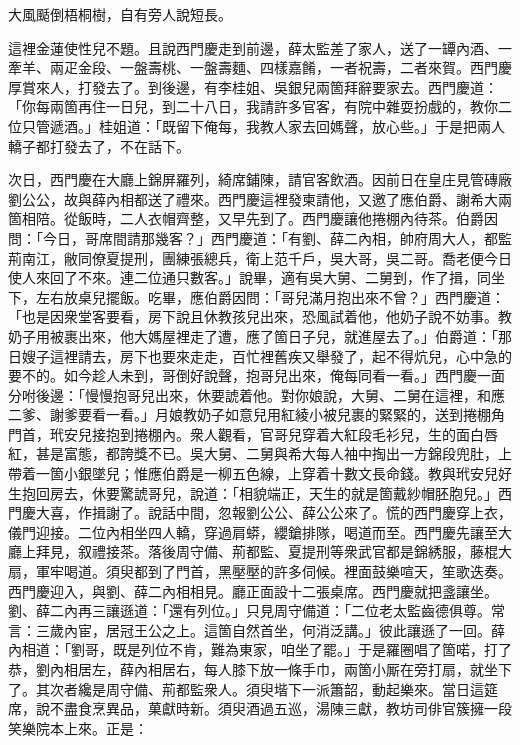 \begin{myquote}
大風颳倒梧桐樹，自有旁人說短長。
\end{myquote}

這裡金蓮使性兒不題。且說西門慶走到前邊，薛太監差了家人，送了一罈內酒、一牽羊、兩疋金段、一盤壽桃、一盤壽麵、四樣嘉餚，一者祝壽，二者來賀。西門慶厚賞來人，打發去了。到後邊，有李桂姐、吳銀兒兩箇拜辭要家去。西門慶道：「你每兩箇再住一日兒，到二十八日，我請許多官客，有院中雜耍扮戲的，教你二位只管遞酒。」桂姐道：「既留下俺每，我教人家去回媽聲，放心些。」于是把兩人轎子都打發去了，不在話下。

次日，西門慶在大廳上錦屏羅列，綺席鋪陳，請官客飲酒。因前日在皇庄見管磚廠劉公公，故與薛內相都送了禮來。西門慶這裡發柬請他，又邀了應伯爵、謝希大兩箇相陪。從飯時，二人衣帽齊整，又早先到了。西門慶讓他捲棚內待茶。伯爵因問：「今日，哥席間請那幾客？」西門慶道：「有劉、薛二內相，帥府周大人，都監荊南江，敝同僚夏提刑，團練張總兵，衛上范千戶，吳大哥，吳二哥。喬老便今日使人來回了不來。連二位通只數客。」說畢，適有吳大舅、二舅到，作了揖，同坐下，左右放桌兒擺飯。吃畢，應伯爵因問：「哥兒滿月抱出來不曾？」西門慶道：「也是因衆堂客要看，房下說且休教孩兒出來，恐風試着他，他奶子說不妨事。教奶子用被裹出來，他大媽屋裡走了遭，應了箇日子兒，就進屋去了。」伯爵道：「那日嫂子這裡請去，房下也要來走走，百忙裡舊疾又舉發了，起不得炕兒，心中急的要不的。如今趁人未到，哥倒好說聲，抱哥兒出來，俺每同看一看。」西門慶一面分咐後邊：「慢慢抱哥兒出來，休要諕着他。對你娘說，大舅、二舅在這裡，和應二爹、謝爹要看一看。」月娘教奶子如意兒用紅綾小被兒裹的緊緊的，送到捲棚角門首，玳安兒接抱到捲棚內。衆人觀看，官哥兒穿着大紅段毛衫兒，生的面白唇紅，甚是富態，都誇獎不已。吳大舅、二舅與希大每人袖中掏出一方錦段兜肚，上帶着一箇小銀墜兒；惟應伯爵是一柳五色線，上穿着十數文長命錢。教與玳安兒好生抱回房去，休要驚諕哥兒，說道：「相貌端正，天生的就是箇戴紗帽胚胞兒。」{}西門慶大喜，作揖謝了。說話中間，忽報劉公公、薛公公來了。慌的西門慶穿上衣，儀門迎接。二位內相坐四人轎，穿過肩蟒，纓鎗排隊，喝道而至。西門慶先讓至大廳上拜見，叙禮接茶。落後周守備、荊都監、夏提刑等衆武官都是錦綉服，藤棍大扇，軍牢喝道。須臾都到了門首，黑壓壓的許多伺候。裡面鼓樂喧天，笙歌迭奏。西門慶迎入，與劉、薛二內相相見。廳正面設十二張桌席。西門慶就把盞讓坐。劉、薛二內再三讓遜道：「還有列位。」只見周守備道：「二位老太監齒德俱尊。常言：三歲內宦，居冠王公之上。這箇自然首坐，何消泛講。」彼此讓遜了一回。薛內相道：「劉哥，既是列位不肯，難為東家，咱坐了罷。」于是羅圈唱了箇喏，打了恭，劉內相居左，薛內相居右，每人膝下放一條手巾，兩箇小厮在旁打扇，就坐下了。其次者纔是周守備、荊都監衆人。須臾堦下一派簫韶，動起樂來。當日這筵席，說不盡食烹異品，菓獻時新。須臾酒過五巡，湯陳三獻，教坊司俳官簇擁一段笑樂院本上來。正是：

